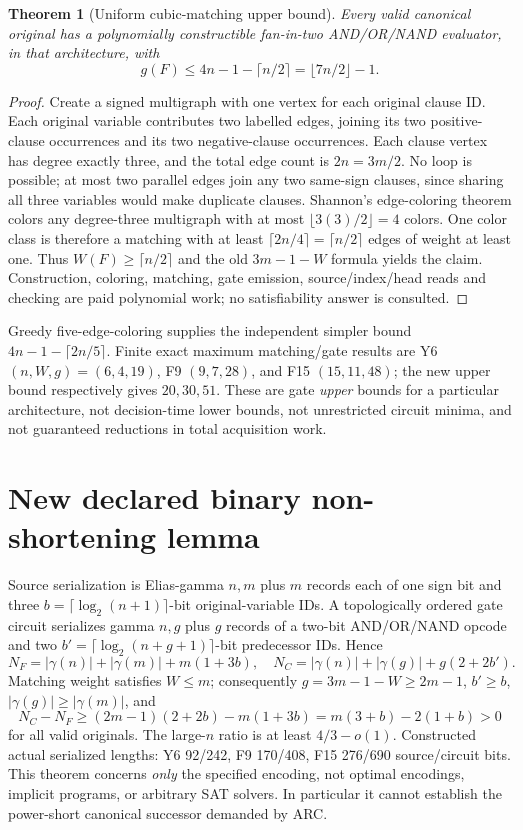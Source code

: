 \documentclass[11pt]{article}
\newtheorem{theorem}{Theorem}
\begin{document}
\begin{theorem}[Uniform cubic-matching upper bound]
Every valid canonical original has a polynomially constructible fan-in-two AND/OR/NAND evaluator, in that architecture, with
\[
g(F)\le 4n-1-\lceil n/2\rceil=\lfloor 7n/2\rfloor-1.
\]
\end{theorem}
\begin{proof}
Create a signed multigraph with one vertex for each original clause ID. Each original variable contributes two labelled edges, joining its two positive-clause occurrences and its two negative-clause occurrences. Each clause vertex has degree exactly three, and the total edge count is $2n=3m/2$. No loop is possible; at most two parallel edges join any two same-sign clauses, since sharing all three variables would make duplicate clauses. Shannon's edge-coloring theorem colors any degree-three multigraph with at most $\lfloor3(3)/2\rfloor=4$ colors. One color class is therefore a matching with at least $\lceil2n/4\rceil=\lceil n/2\rceil$ edges of weight at least one. Thus $W(F)\ge\lceil n/2\rceil$ and the old $3m-1-W$ formula yields the claim. Construction, coloring, matching, gate emission, source/index/head reads and checking are paid polynomial work; no satisfiability answer is consulted.
\end{proof}
Greedy five-edge-coloring supplies the independent simpler bound $4n-1-\lceil2n/5\rceil$. Finite exact maximum matching/gate results are Y6 $(n,W,g)=(6,4,19)$, F9 $(9,7,28)$, and F15 $(15,11,48)$; the new upper bound respectively gives $20,30,51$. These are gate \emph{upper} bounds for a particular architecture, not decision-time lower bounds, not unrestricted circuit minima, and not guaranteed reductions in total acquisition work.

\section{New declared binary non-shortening lemma}
Source serialization is Elias-gamma $n,m$ plus $m$ records each of one sign bit and three $b=\lceil\log_2(n+1)\rceil$-bit original-variable IDs. A topologically ordered gate circuit serializes gamma $n,g$ plus $g$ records of a two-bit AND/OR/NAND opcode and two $b'=\lceil\log_2(n+g+1)\rceil$-bit predecessor IDs. Hence
\[
N_F=|\gamma(n)|+|\gamma(m)|+m(1+3b),\quad
N_C=|\gamma(n)|+|\gamma(g)|+g(2+2b').
\]
Matching weight satisfies $W\le m$; consequently $g=3m-1-W\ge2m-1$, $b'\ge b$, $|\gamma(g)|\ge|\gamma(m)|$, and
\[
N_C-N_F\ge (2m-1)(2+2b)-m(1+3b)
=m(3+b)-2(1+b)>0
\]
for all valid originals. The large-$n$ ratio is at least $4/3-o(1)$. Constructed actual serialized lengths: Y6 92/242, F9 170/408, F15 276/690 source/circuit bits. This theorem concerns \emph{only} the specified encoding, not optimal encodings, implicit programs, or arbitrary SAT solvers. In particular it cannot establish the power-short canonical successor demanded by ARC.
\end{document}
